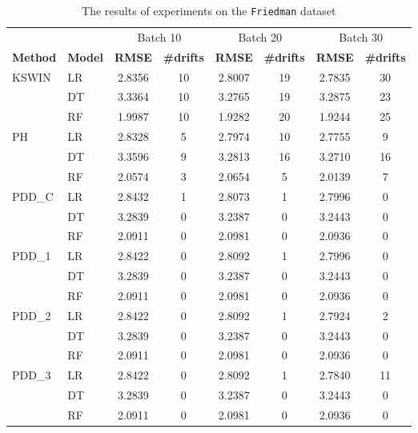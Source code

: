 \begin{table}[h]
    \centering
    \scriptsize
    \caption{The results of experiments on the \texttt{Friedman} dataset}
    \label{tab:exp_Friedman_topk}
    \begin{tabular}{llcccccc}\toprule
         & & \multicolumn{2}{c}{Batch 10} & \multicolumn{2}{c}{Batch 20} & \multicolumn{2}{c}{Batch 30} \\\cmidrule(lr){3-4}\cmidrule(lr){5-6}\cmidrule(lr){7-8}
         \textbf{Method} & \textbf{Model} & \textbf{RMSE} & \textbf{\#drifts} & \textbf{RMSE} & \textbf{\#drifts} & \textbf{RMSE} & \textbf{\#drifts} \\\midrule
    KSWIN    & LR & 2.8356 & 10 & 2.8007 & 19 & 2.7835 & 30 \\
             & DT & 3.3364 & 10 & 3.2765 & 19 & 3.2875 & 23 \\
             & RF & 1.9987 & 10 & 1.9282 & 20 & 1.9244 & 25 \\
    \midrule
    PH       & LR & 2.8328 & 5 & 2.7974 & 10 & 2.7755 & 9 \\
             & DT & 3.3596 & 9 & 3.2813 & 16 & 3.2710 & 16 \\
             & RF & 2.0574 & 3 & 2.0654 & 5 & 2.0139 & 7 \\
    \midrule
    PDD\_C   & LR & 2.8432 & 1 & 2.8073 & 1 & 2.7996 & 0 \\
             & DT & 3.2839 & 0 & 3.2387 & 0 & 3.2443 & 0 \\
             & RF & 2.0911 & 0 & 2.0981 & 0 & 2.0936 & 0 \\
    \midrule
    PDD\_1   & LR & 2.8422 & 0 & 2.8092 & 1 & 2.7996 & 0 \\
             & DT & 3.2839 & 0 & 3.2387 & 0 & 3.2443 & 0 \\
             & RF & 2.0911 & 0 & 2.0981 & 0 & 2.0936 & 0 \\
    \midrule
    PDD\_2   & LR & 2.8422 & 0 & 2.8092 & 1 & 2.7924 & 2 \\
             & DT & 3.2839 & 0 & 3.2387 & 0 & 3.2443 & 0 \\
             & RF & 2.0911 & 0 & 2.0981 & 0 & 2.0936 & 0 \\
    \midrule
    PDD\_3   & LR & 2.8422 & 0 & 2.8092 & 1 & 2.7840 & 11 \\
             & DT & 3.2839 & 0 & 3.2387 & 0 & 3.2443 & 0 \\
             & RF & 2.0911 & 0 & 2.0981 & 0 & 2.0936 & 0 \\
    \bottomrule
    \end{tabular}
\end{table}

